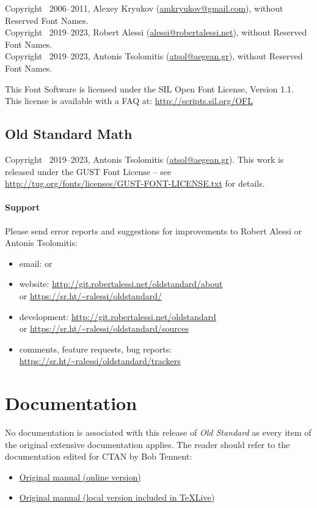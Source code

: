 Copyright \textcopyright\ 2006--2011, Alexey Kryukov
(\href{mailto:amkryukov@gmail.com}{amkryukov@gmail.com}), without
Reserved Font Names.
\\
Copyright \textcopyright\ 2019--2023, Robert Alessi
(\href{mailto:alessi@robertalessi.net}{alessi@robertalessi.net}), without
Reserved Font Names.
\\
Copyright \textcopyright\ 2019--2023, Antonis Tsolomitis
(\href{mailto:atsol@aegean.gr}{atsol@aegean.gr}), without
Reserved Font Names.

This Font Software is licensed under the SIL Open Font License,
Version 1.1. This license is available with a FAQ at:
\url{http://scripts.sil.org/OFL}

\subsection{Old Standard Math}
\label{sec:old-standard-math}
Copyright \textcopyright\ 2019--2023, Antonis Tsolomitis
(\href{mailto:atsol@aegean.gr}{atsol@aegean.gr}). 
This work is released under the GUST Font License -- see
\url{http://tug.org/fonts/licenses/GUST-FONT-LICENSE.txt} for details.

\paragraph{Support}
Please send error reports and suggestions for improvements to Robert
Alessi or Antonis Tsolomitis:
\begin{itemize}
\item email:  or
\item website: \url{http://git.robertalessi.net/oldstandard/about}\\
  or \url{https://sr.ht/~ralessi/oldstandard/}
\item development: \url{http://git.robertalessi.net/oldstandard}\\
  or \url{https://sr.ht/~ralessi/oldstandard/sources}
\item comments, feature requests, bug reports:
\url{https://sr.ht/~ralessi/oldstandard/trackers}
\end{itemize}

\section{Documentation}
\label{sec:documentation}
No documentation is associated with this release of \emph{Old
  Standard} as every item of the original extensive documentation
applies. The reader should refer to the documentation edited for CTAN
by Bob Tennent:
\begin{itemize}
\item
  \href{http://mirrors.ctan.org/fonts/oldstandard/doc/oldstand-manual.pdf}%
  {Original manual (online version)}
\item \href{oldstand-manual.pdf}{Original manual (local version
    included in {\TeX}Live)}
\end{itemize}

